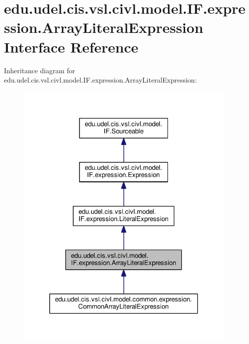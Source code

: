 \hypertarget{interfaceedu_1_1udel_1_1cis_1_1vsl_1_1civl_1_1model_1_1IF_1_1expression_1_1ArrayLiteralExpression}{}\section{edu.\+udel.\+cis.\+vsl.\+civl.\+model.\+I\+F.\+expression.\+Array\+Literal\+Expression Interface Reference}
\label{interfaceedu_1_1udel_1_1cis_1_1vsl_1_1civl_1_1model_1_1IF_1_1expression_1_1ArrayLiteralExpression}


Inheritance diagram for edu.\+udel.\+cis.\+vsl.\+civl.\+model.\+I\+F.\+expression.\+Array\+Literal\+Expression\+:
\nopagebreak
\begin{figure}[H]
\begin{center}
\leavevmode
\includegraphics[width=306pt]{interfaceedu_1_1udel_1_1cis_1_1vsl_1_1civl_1_1model_1_1IF_1_1expression_1_1ArrayLiteralExpression__inherit__graph}
\end{center}
\end{figure}


